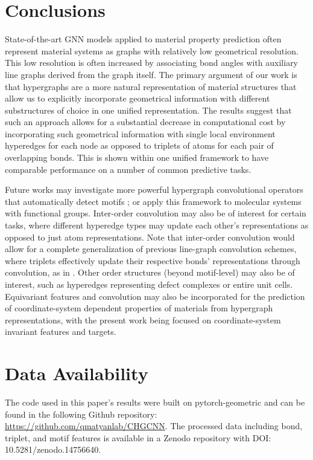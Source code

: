 \documentclass[10pt,a4paper,twocolumn]{article}
\begin{document}
\section{Conclusions}
State-of-the-art GNN models applied to material property prediction often represent material systems as graphs with relatively low geometrical resolution. This low resolution is often increased by associating bond angles with auxiliary line graphs derived from the graph itself. The primary argument of our work is that hypergraphs are a more natural representation of material structures that allow us to explicitly incorporate geometrical information with different substructures of choice in one unified representation. The results suggest that such an approach allows for a substantial decrease in computational cost by incorporating such geometrical information with single local environment hyperedges for each node as opposed to triplets of atoms for each pair of overlapping bonds. This is shown within one unified framework to have comparable performance on a number of common predictive tasks.

Future works may investigate more powerful hypergraph convolutional operators that automatically detect motifs \cite{contrastivelearn_motif, motifexplore, motife3nn}; or apply this framework to molecular systems \cite{ molecule2, molecule3} with functional groups. Inter-order convolution may also be of interest for certain tasks, where different hyperedge types may update each other's representations as opposed to just atom representations. Note that inter-order convolution would allow for a complete generalization of previous line-graph convolution schemes, where triplets effectively update their respective bonds' representations through convolution, as in \cite{alignn, congn}. Other order structures (beyond motif-level) may also be of interest, such as hyperedges representing defect complexes or entire unit cells. Equivariant features and convolution \cite{e3nn, tfn, o3transformer1} may also be incorporated for the prediction of coordinate-system dependent properties of materials from hypergraph representations, with the present work being focused on coordinate-system invariant features and targets. 


\section{Data Availability}
The code used in this paper's results were built on pytorch-geometric and can be found in the following Github repository: \hyperlink{https://github.com/qmatyanlab/CHGCNN}{https://github.com/qmatyanlab/CHGCNN}. The processed data including bond, triplet, and motif features is available in a Zenodo repository with DOI: 10.5281/zenodo.14756640.
\end{document}
